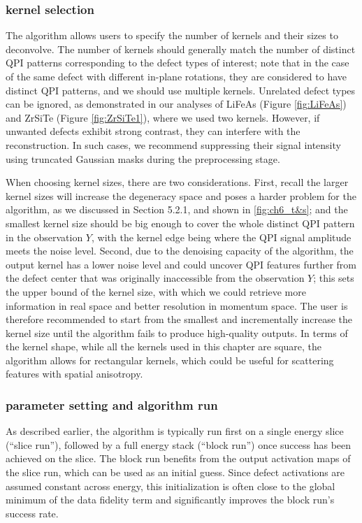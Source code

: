\subsubsection{kernel selection}
The algorithm allows users to specify the number of kernels and their sizes to deconvolve. The number of kernels should generally match the number of distinct QPI patterns corresponding to the defect types of interest; note that in the case of the same defect with different in-plane rotations, they are considered to have distinct QPI patterns, and we should use multiple kernels. Unrelated defect types can be ignored, as demonstrated in our analyses of LiFeAs (Figure \ref{fig:LiFeAs}) and ZrSiTe (Figure \ref{fig:ZrSiTe1}), where we used two kernels. However, if unwanted defects exhibit strong contrast, they can interfere with the reconstruction. In such cases, we recommend suppressing their signal intensity using truncated Gaussian masks during the preprocessing stage. 

When choosing kernel sizes, there are two considerations. First, recall the larger kernel sizes will increase the degeneracy space and poses a harder problem for the algorithm, as we discussed in Section 5.2.1, and shown in \ref{fig:ch6_t&s}; and the smallest kernel size should be big enough to cover the whole distinct QPI pattern in the observation $Y$, with the kernel edge being where the QPI signal amplitude meets the noise level. Second, due to the denoising capacity of the algorithm, the output kernel has a lower noise level and could uncover QPI features further from the defect center that was originally inaccessible from the observation $Y$; this sets the upper bound of the kernel size, with which we could retrieve more information in real space and better resolution in momentum space. The user is therefore recommended to start from the smallest and incrementally increase the kernel size until the algorithm fails to produce high-quality outputs. In terms of the kernel shape, while all the kernels used in this chapter are square, the algorithm allows for rectangular kernels, which could be useful for scattering features with spatial anisotropy.

\subsubsection{parameter setting and algorithm run}
As described earlier, the algorithm is typically run first on a single energy slice (“slice run”), followed by a full energy stack (“block run”) once success has been achieved on the slice. The block run benefits from the output activation maps of the slice run, which can be used as an initial guess. Since defect activations are assumed constant across energy, this initialization is often close to the global minimum of the data fidelity term and significantly improves the block run’s success rate.

